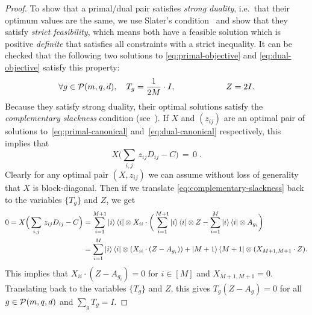 \begin{proof}
To show that a primal/dual pair satisfies \emph{strong duality}, i.e.\ that their optimum values are the same,
we use Slater's condition~\cite[Section~5.2.3]{cvxbook} and show that they satisfy \emph{strict feasibility}, which means both have a feasible solution which is positive \emph{definite}
that satisfies all constraints with a strict inequality.
It can be checked that the following two solutions to \eqref{eq:primal-objective} and \eqref{eq:dual-objective} satisfy this property:
\begin{equation*}
\forall g \in \mathcal{P}(m, q, d), \quad T_g = \frac{1}{2M} \cdot I,
\qquad\qquad\qquad
Z = 2I.
\end{equation*}
Because they satisfy strong duality, their optimal solutions satisfy the \emph{complementary slackness} condition (see~\cite{AHO97}).
If $X$ and $(z_{ij})$ are an optimal pair of solutions to~\eqref{eq:primal-canonical} and~\eqref{eq:dual-canonical} respectively,  this implies that
\begin{equation}\label{eq:complementary-slackness}
X\Big( \sum_{i,j} \,z_{ij} D_{ij} - C \Big) \,=\, 0 \;.
\end{equation}
Clearly for any optimal pair $(X,z_{ij})$ we can assume without loss of generality that $X$ is block-diagonal.
Then if we translate \eqref{eq:complementary-slackness} back to the variables $\{T_g\}$ and $Z$, we get
\begin{align*}
0 = X\Big( \sum_{i,j} \,z_{ij} D_{ij} - C \Big)
&= \sum_{i=1}^{M+1} \ket{i}\bra{i} \otimes X_{ii} \cdot \bigg(\sum_{i=1}^{M+1} \ket{i}\bra{i} \otimes Z - \sum_{i=1}^M \ket{i}\bra{i}\otimes A_{g_i}\bigg)\\
&= \sum_{i=1}^{M} \ket{i}\bra{i} \otimes (X_{ii} \cdot (Z - A_{g_i})) + \ket{M+1}\bra{M+1} \otimes (X_{M+1,M+1} \cdot Z).
\end{align*}
This implies that $X_{ii} \cdot (Z - A_{g_i}) = 0$ for $i \in [M]$ and $X_{M+1, M+1} = 0$.
Translating back to the variables $\{T_g\}$ and $Z$, this gives $T_g(Z-A_g)=0$ for all $g\in\mathcal{P}(m, q, d)$ and $\sum_g T_g = I$. 
\end{proof}


